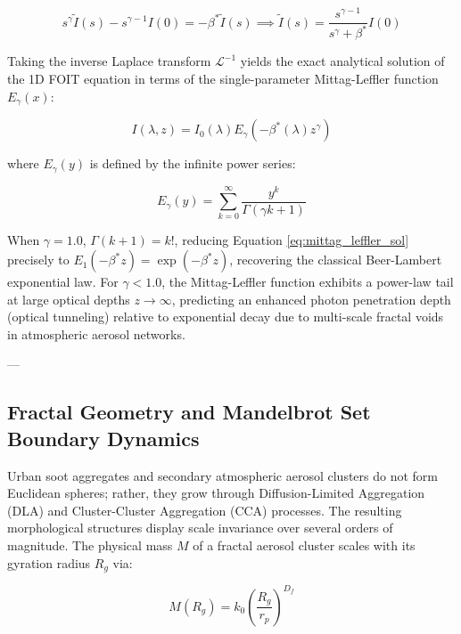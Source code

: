 \documentclass[12pt,a4paper]{article}
\begin{document}
\begin{equation}
s^\gamma \tilde{I}(s) - s^{\gamma-1} I(0) = -\beta^* \tilde{I}(s) \implies \tilde{I}(s) = \frac{s^{\gamma-1}}{s^\gamma + \beta^*} I(0)
\end{equation}

Taking the inverse Laplace transform $\mathcal{L}^{-1}$ yields the exact analytical solution of the 1D FOIT equation in terms of the single-parameter Mittag-Leffler function $E_\gamma(x)$:

\begin{equation}
I(\lambda, z) = I_0(\lambda) E_\gamma \left( -\beta^*(\lambda) z^\gamma \right)
\label{eq:mittag_leffler_sol}
\end{equation}

where $E_\gamma(y)$ is defined by the infinite power series:

\begin{equation}
E_\gamma(y) = \sum_{k=0}^{\infty} \frac{y^k}{\Gamma(\gamma k + 1)}
\label{eq:mittag_leffler_def}
\end{equation}

When $\gamma = 1.0$, $\Gamma(k + 1) = k!$, reducing Equation \ref{eq:mittag_leffler_sol} precisely to $E_1(-\beta^* z) = \exp(-\beta^* z)$, recovering the classical Beer-Lambert exponential law. For $\gamma < 1.0$, the Mittag-Leffler function exhibits a power-law tail at large optical depths $z \to \infty$, predicting an enhanced photon penetration depth (optical tunneling) relative to exponential decay due to multi-scale fractal voids in atmospheric aerosol networks.

---

\subsection{Fractal Geometry and Mandelbrot Set Boundary Dynamics}

Urban soot aggregates and secondary atmospheric aerosol clusters do not form Euclidean spheres; rather, they grow through Diffusion-Limited Aggregation (DLA) and Cluster-Cluster Aggregation (CCA) processes. The resulting morphological structures display scale invariance over several orders of magnitude. The physical mass $M$ of a fractal aerosol cluster scales with its gyration radius $R_g$ via:

\begin{equation}
M(R_g) = k_0 \left( \frac{R_g}{r_p} \right)^{D_f}
\label{eq:fractal_mass}
\end{equation}
\end{document}
